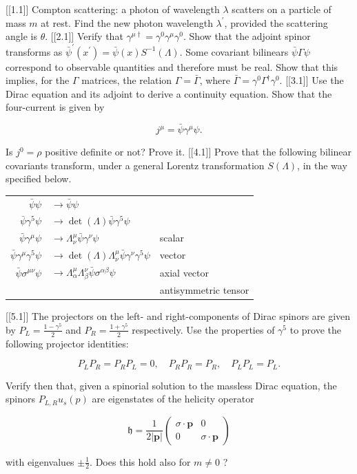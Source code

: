 [[1.1]] Compton scattering: a photon of wavelength $\lambda$ scatters on a particle of mass $m$ at rest. Find the new photon wavelength $\lambda^{\prime}$, provided the scattering angle is $\theta$.
[[2.1]] Verify that $\gamma^{\mu \dagger}=\gamma^0 \gamma^\mu \gamma^0$. Show that the adjoint spinor transforms as $\bar{\psi}^{\prime}\left(x^{\prime}\right)= \bar{\psi}(x) S^{-1}(\Lambda)$. Some covariant bilinears $\bar{\psi} \Gamma \psi$ correspond to observable quantities and therefore must be real. Show that this implies, for the $\Gamma$ matrices, the relation $\Gamma=\bar{\Gamma}$, where $\bar{\Gamma}=\gamma^0 \Gamma^{\dagger} \gamma^0$.
[[3.1]] Use the Dirac equation and its adjoint to derive a continuity equation. Show that the four-current is given by

$$
j^\mu=\bar{\psi} \gamma^\mu \psi .
$$


Is $j^0=\rho$ positive definite or not? Prove it.
[[4.1]] Prove that the following bilinear covariants transform, under a general Lorentz transformation $S(\Lambda)$, in the way specified below.

\begin{tabular}{rll}
$\bar{\psi} \psi$ & $\rightarrow \bar{\psi} \psi$ & \\
$\bar{\psi} \gamma^5 \psi$ & $\rightarrow \operatorname{det}(\Lambda) \bar{\psi} \gamma^5 \psi$ & \\
$\bar{\psi} \gamma^\mu \psi$ & $\rightarrow \Lambda_\nu^\mu \bar{\psi} \gamma^\nu \psi$ & scalar \\
$\bar{\psi} \gamma^\mu \gamma^5 \psi$ & $\rightarrow \operatorname{det}(\Lambda) \Lambda_\nu^\mu \bar{\psi} \gamma^\nu \gamma^5 \psi$ & vector \\
$\bar{\psi} \sigma^{\mu \nu} \psi$ & $\rightarrow \Lambda_\alpha^\mu \Lambda_\beta^\nu \bar{\psi} \sigma^{\alpha \beta} \psi$ & axial vector \\
& & antisymmetric tensor
\end{tabular}
[[5.1]] The projectors on the left- and right-components of Dirac spinors are given by $P_L=\frac{1-\gamma^5}{2}$ and $P_R=\frac{1+\gamma^5}{2}$ respectively. Use the properties of $\gamma^5$ to prove the following projector identities:

$$
P_L P_R=P_R P_L=0, \quad P_R P_R=P_R, \quad P_L P_L=P_L .
$$


Verify then that, given a spinorial solution to the massless Dirac equation, the spinors $P_{L, R} u_s(p)$ are eigenstates of the helicity operator

$$
\mathfrak{h}=\frac{1}{2|\mathbf{p}|}\left(\begin{array}{cc}
\sigma \cdot \mathbf{p} & 0 \\
0 & \sigma \cdot \mathbf{p}
\end{array}\right)
$$

with eigenvalues $\pm \frac{1}{2}$. Does this hold also for $m \neq 0$ ?
